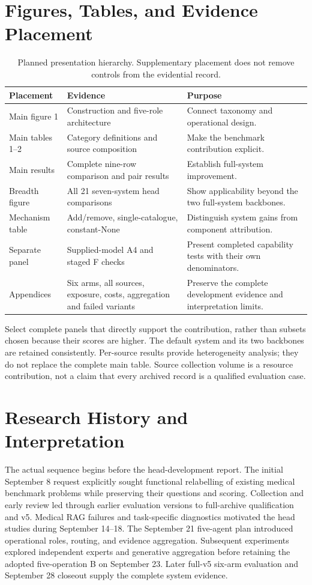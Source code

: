 \documentclass[11pt,a4paper]{article}
\begin{document}
\section{Figures, Tables, and Evidence Placement}
\begin{table}[tbp]
\centering\small
\caption{Planned presentation hierarchy. Supplementary placement does not remove controls from the evidential record.}
\begin{tabularx}{\linewidth}{@{}lXX@{}}
\toprule
Placement & Evidence & Purpose \\
\midrule
Main figure 1 & Construction and five-role architecture & Connect taxonomy and operational design. \\
Main tables 1--2 & Category definitions and source composition & Make the benchmark contribution explicit. \\
Main results & Complete nine-row comparison and pair results & Establish full-system improvement. \\
Breadth figure & All 21 seven-system head comparisons & Show applicability beyond the two full-system backbones. \\
Mechanism table & Add/remove, single-catalogue, constant-None & Distinguish system gains from component attribution. \\
Separate panel & Supplied-model A4 and staged F checks & Present completed capability tests with their own denominators. \\
Appendices & Six arms, all sources, exposure, costs, aggregation and failed variants & Preserve the complete development evidence and interpretation limits. \\
\bottomrule
\end{tabularx}
\end{table}
Select complete panels that directly support the contribution, rather than subsets chosen because their scores are higher. The default system and its two backbones are retained consistently. Per-source results provide heterogeneity analysis; they do not replace the complete main table. Source collection volume is a resource contribution, not a claim that every archived record is a qualified evaluation case.

\section{Research History and Interpretation}
The actual sequence begins before the head-development report. The initial September 8 request explicitly sought functional relabelling of existing medical benchmark problems while preserving their questions and scoring. Collection and early review led through earlier evaluation versions to full-archive qualification and v5. Medical RAG failures and task-specific diagnostics motivated the head studies during September 14--18. The September 21 five-agent plan introduced operational roles, routing, and evidence aggregation. Subsequent experiments explored independent experts and generative aggregation before retaining the adopted five-operation B on September 23. Later full-v5 six-arm evaluation and September 28 closeout supply the complete system evidence.
\end{document}
